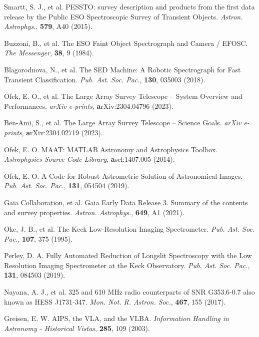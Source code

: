 \documentclass{nature_plusfigure}
\newcommand{\mn}{{Mon. Not. R. Astron. Soc.}}
\newcommand{\mnras}{\mn}
\newcommand{\aap}{{Astron. Astrophys.}}
\newcommand{\pasp}{{Pub. Ast. Soc. Pac.}}
\begin{document}
\begin{methods}
\begin{thebibliography}{10}

 Smartt, S. J., et al. PESSTO: survey description and products from the first data release by the Public ESO Spectroscopic Survey of Transient Objects. \emph{\aap}, \textbf{579}, A40 (2015). 

 Buzzoni, B., et al. The ESO Faint Object Spectrograph and Camera / EFOSC. \emph{The Messenger}, \textbf{38}, 9 (1984). 


 Blagorodnova, N., et al. The SED Machine: A Robotic Spectrograph for Fast Transient Classification. \emph{\pasp}, \textbf{130}, 035003 (2018). 


 Ofek, E. O., et al. The Large Array Survey Telescope -- System Overview and Performances. \emph{arXiv e-prints}, \textbf arXiv:2304.04796 (2023). 

 Ben-Ami, S., et al. The Large Array Survey Telescope -- Science Goals. \emph{arXiv e-prints}, \textbf arXiv:2304.02719 (2023). 

 Ofek, E. O. MAAT: MATLAB Astronomy and Astrophysics Toolbox. \emph{Astrophysics Source Code Library}, \textbf ascl:1407.005 (2014). 

 Ofek, E. O. A Code for Robust Astrometric Solution of Astronomical Images. \emph{\pasp}, \textbf{131}, 054504 (2019). 

  Gaia Collaboration, et al. Gaia Early Data Release 3. Summary of the contents and survey properties. \emph{\aap}, \textbf{649}, A1 (2021). 


 Oke, J. B., et al. The Keck Low-Resolution Imaging Spectrometer. \emph{\pasp}, \textbf{107}, 375 (1995). 
 
 Perley, D. A. Fully Automated Reduction of Longslit Spectroscopy with the Low Resolution Imaging Spectrometer at the Keck Observatory. \emph{\pasp}, \textbf{131}, 084503 (2019). 


 Nayana, A. J., et al. 325 and 610 MHz radio counterparts of SNR G353.6-0.7 also known as HESS J1731-347. \emph{\mnras}, \textbf{467}, 155 (2017). 

 Greisen, E. W. AIPS, the VLA, and the VLBA. \emph{Information Handling in Astronomy - Historical Vistas}, \textbf{285}, 109 (2003). 


\end{thebibliography}
\end{methods}
\end{document}
